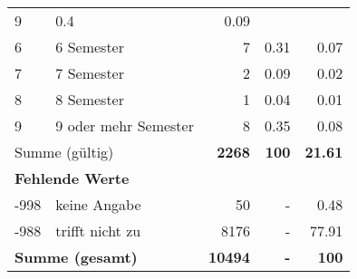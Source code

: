 \begin{longtable}{lXrrr}
       \num{9} &
       \num[round-mode=places,round-precision=2]{0.4} &
         \num[round-mode=places,round-precision=2]{0.09} \\

     6 &
     \multicolumn{1}{X}{ 6 Semester   } &


       \num{7} &
       \num[round-mode=places,round-precision=2]{0.31} &
         \num[round-mode=places,round-precision=2]{0.07} \\

     7 &
     \multicolumn{1}{X}{ 7 Semester   } &


       \num{2} &
       \num[round-mode=places,round-precision=2]{0.09} &
         \num[round-mode=places,round-precision=2]{0.02} \\

     8 &
     \multicolumn{1}{X}{ 8 Semester   } &


       \num{1} &
       \num[round-mode=places,round-precision=2]{0.04} &
         \num[round-mode=places,round-precision=2]{0.01} \\

     9 &
     \multicolumn{1}{X}{ 9 oder mehr Semester   } &


       \num{8} &
       \num[round-mode=places,round-precision=2]{0.35} &
         \num[round-mode=places,round-precision=2]{0.08} \\
     \midrule
     \multicolumn{2}{l}{Summe (gültig)} &
       \textbf{\num{2268}} &
     \textbf{\num{100}} &
       \textbf{\num[round-mode=places,round-precision=2]{21.61}} \\
     \multicolumn{5}{l}{\textbf{Fehlende Werte}}\\
       -998 &
       keine Angabe &
         \num{50} &
        - &
         \num[round-mode=places,round-precision=2]{0.48} \\
       -988 &
       trifft nicht zu &
         \num{8176} &
        - &
         \num[round-mode=places,round-precision=2]{77.91} \\
     \midrule
     \multicolumn{2}{l}{\textbf{Summe (gesamt)}} &
          \textbf{\num{10494}} &
        \textbf{-} &
        \textbf{\num{100}} \\
     \bottomrule
     \end{longtable}
     
